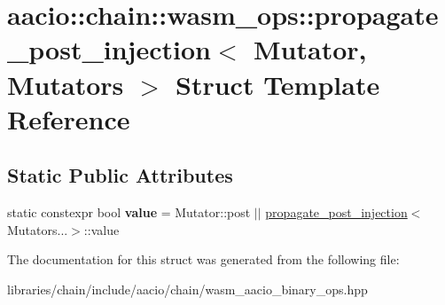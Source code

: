 \hypertarget{structaacio_1_1chain_1_1wasm__ops_1_1propagate__post__injection}{}\section{aacio\+:\+:chain\+:\+:wasm\+\_\+ops\+:\+:propagate\+\_\+post\+\_\+injection$<$ Mutator, Mutators $>$ Struct Template Reference}
\label{structaacio_1_1chain_1_1wasm__ops_1_1propagate__post__injection}
\subsection*{Static Public Attributes}
\begin{DoxyCompactItemize}
\item 
\mbox{\label{structaacio_1_1chain_1_1wasm__ops_1_1propagate__post__injection_a477da403a3ccc9fa0b3fcb0c0e275fa7}} 
static constexpr bool {\bfseries value} = Mutator\+::post $\vert$$\vert$ \mbox{\hyperlink{structaacio_1_1chain_1_1wasm__ops_1_1propagate__post__injection}{propagate\+\_\+post\+\_\+injection}}$<$Mutators...$>$\+::value
\end{DoxyCompactItemize}


The documentation for this struct was generated from the following file\+:\begin{DoxyCompactItemize}
\item 
libraries/chain/include/aacio/chain/wasm\+\_\+aacio\+\_\+binary\+\_\+ops.\+hpp\end{DoxyCompactItemize}
